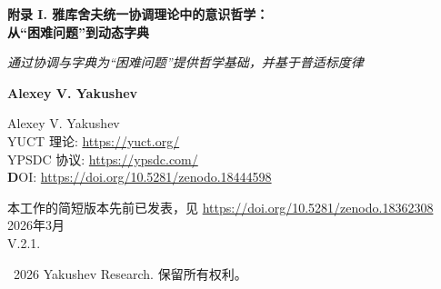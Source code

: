 \documentclass[12pt,a4paper]{article}
\DeclareRobustCommand{\alD}{\texorpdfstring{\ensuremath{\alpha_{\mathrm{D}}}}{alpha_D}}
\DeclareRobustCommand{\beI}{\texorpdfstring{\ensuremath{\beta_{\mathrm{I}}}}{beta_I}}
\DeclareRobustCommand{\gaR}{\texorpdfstring{\ensuremath{\gamma_{\mathrm{R}}}}{gamma_R}}
\newcommand{\eff}{\mathrm{eff}}
\newcommand{\Ke}{K_{\eff}}
\begin{document}
	
	\begin{titlepage}
		\begin{center}
			\vspace*{0cm}
			
			\Huge\textbf{附录 I. 雅库舍夫统一协调理论中的意识哲学：\\ 从“困难问题”到动态字典}
			
			\vspace{1cm}
			
			\small\textit{通过协调与字典为“困难问题”提供哲学基础，并基于普适标度律}
			
			\vspace{0.5cm}
			
			\small\textbf{Alexey V. Yakushev}
			
			\vspace{0.5cm}
			\Large
			Alexey V. Yakushev\\
			
			YUCT 理论: \url{https://yuct.org/}\\
			YPSDC 协议: \url{https://ypsdc.com/}\\
			
			
			\vspace{1cm}
			\textbf DOI: \url{https://doi.org/10.5281/zenodo.18444598}\\
			
			\vspace{0.5cm}
			
			\vspace{0cm}
			\large 
			本工作的简短版本先前已发表，见 \url{https://doi.org/10.5281/zenodo.18362308}\\
			\vspace{1cm}
			2026年3月 \\ \large V.2.1.
			
			\vspace{4cm}
			\textcopyright~2026 Yakushev Research. 保留所有权利。
			
			\newpage
			
			\begin{abstract}
				\noindent
				本文在统一协调理论（YUCT）框架内为解决“意识困难问题”提供了哲学基础。意识不被视为副现象或幻觉，而是通过 \textbf{内部字典层次结构} 实现的 \textbf{动态协调过程}。我们表明，经典的“大脑–意识”二元论可以通过三层模型加以克服：\textbf{遗传字典}、\textbf{神经字典} 和 \textbf{文化字典}。主观经验被解释为神经集群利用共享语义空间进行 \textbf{实时协调} 的结果。元字典（反思自身状态的能力）解释了自我性的现象。
				
				关键的是，这一哲学框架现在基于普适经验定律 \(\varepsilon = \kappa_c \alpha \Ke^{-\beta}\)，其中 \(\beta = 0.67\)，该定律已在超过 50 个数量级上得到验证（附录 L），并在六个科学领域独立确认：物理学（引力波，GWTC-4.0）、天体物理学（白矮星，26,041 个天体）、地球物理学（地月系统）、化学（873 个键能）、生物学（68 个脊椎动物基因组）和神经科学（意识的 EEG 相关性，UCD 参数）。特别是，附录 H 中引入的通用意识描述符（UCD）提供了与意识状态相关并遵循相同标度律的定量度量 \(\alD, \beI, \gaR\)。
				

\end{abstract}
\end{center}
\end{titlepage}
\end{document}

